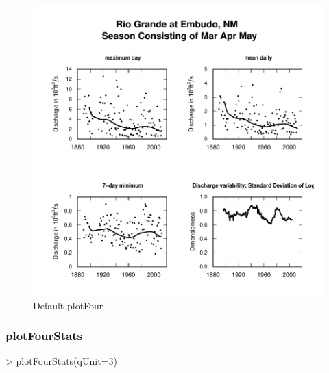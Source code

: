 \documentclass[a4paper,11pt]{article}
\begin{document}
\begin{figure}[h]
\begin{center}

\includegraphics{EGRET-figplotFour}
\end{center}
\caption{Default plotFour}
\label{fig:plotFour}
\end{figure}

\FloatBarrier
\subsubsection{plotFourStats}
\label{plotFourStats}
\begin{Schunk}
\begin{Sinput}
> plotFourStats(qUnit=3)
\end{Sinput}
\end{Schunk}
\end{document}
